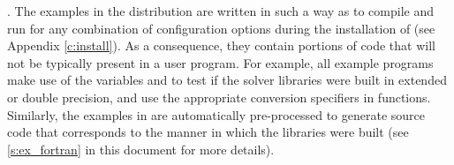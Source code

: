 \vspace{0.2in}.
The examples in the {\cvode} distribution are written in such a way as
to compile and run for any combination of configuration options during
the installation of {\sundials} (see Appendix \ref{c:install}). As a consequence,
they contain portions of code that will not be typically present in a
user program. For example, all {\C} example programs make use of the
variables  and 
to test if the solver libraries were built in extended or double precision,
and use the appropriate conversion specifiers in  functions.
Similarly, the {\F} examples in {\fcvode} are automatically pre-processed to
generate source code that corresponds to the manner in which the {\cvode}
libraries were built (see \ref{s:ex_fortran} in this document for more details).
